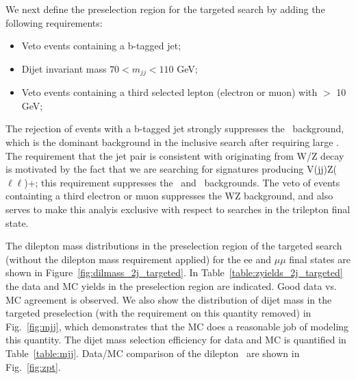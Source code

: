 \clearpage

We next define the preselection region for the targeted search by adding the following requirements:
\begin{itemize}
\item Veto events containing a b-tagged jet;
\item Dijet invariant mass $70<m_{jj}<110$ GeV;
\item Veto events containing a third selected lepton (electron or muon) with \pt $>$ 10 GeV; 
\end{itemize}

The rejection of events with a b-tagged jet strongly suppresses the \ttbar\ background, which is the dominant background in the inclusive search
after requiring large \MET. The requirement that the jet pair is consistent with originating from W/Z decay is motivated by the fact that we are 
searching for signatures producing V(jj)Z($\ell\ell$)+\MET; this requirement suppresses the \zjets\ and \ttbar\ backgrounds. The veto of events
containting a third electron or muon suppresses the WZ background, and also serves to make this analyis exclusive with respect to searches in
the trilepton final state.

The dilepton mass distributions in the preselection region of the targeted search (without the dilepton mass requirement applied) 
for the ee and $\mu\mu$ final states are shown in Figure~\ref{fig:dilmass_2j_targeted}. In Table~\ref{table:zyields_2j_targeted} 
the data and MC yields in the preselection region are indicated. Good data vs. MC agreement is observed.
We also show the distribution of dijet mass in the targeted preselection (with the requirement on this quantity removed) in Fig.~\ref{fig:mjj},
which demonstrates that the MC does a reasonable job of modeling this quantity. The dijet mass selection efficiency for data and MC
is quantified in Table~\ref{table:mjj}. Data/MC comparison of the dilepton \pt\ are shown in Fig.~\ref{fig:zpt}.


